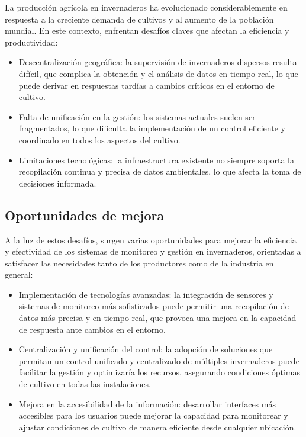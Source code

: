 La producción agrícola en invernaderos ha evolucionado considerablemente en respuesta a la creciente demanda de cultivos y al aumento de la población mundial. En este contexto, enfrentan desafíos claves que afectan la eficiencia y productividad:

\begin{itemize}
	\item Descentralización geográfica: la supervisión de invernaderos dispersos resulta difícil, que complica la obtención y el análisis de datos en tiempo real, lo que puede derivar en respuestas tardías a cambios críticos en el entorno de cultivo.
	\item Falta de unificación en la gestión: los sistemas actuales suelen ser fragmentados, lo que dificulta la implementación de un control eficiente y coordinado en todos los aspectos del cultivo.
	\item Limitaciones tecnológicas: la infraestructura existente no siempre soporta la recopilación continua y precisa de datos ambientales, lo que afecta la toma de decisiones informada.
\end{itemize}

\subsection{Oportunidades de mejora}

A la luz de estos desafíos, surgen varias oportunidades para mejorar la eficiencia y efectividad de los sistemas de monitoreo y gestión en invernaderos, orientadas a satisfacer las necesidades tanto de los productores como de la industria en general:

\begin{itemize}
	\item Implementación de tecnologías avanzadas: la integración de sensores y sistemas de monitoreo más sofisticados puede permitir una recopilación de datos más precisa y en tiempo real, que provoca una mejora en la capacidad de respuesta ante cambios en el entorno.
	\item Centralización y unificación del control: la adopción de soluciones que permitan un control unificado y centralizado de múltiples invernaderos puede facilitar la gestión y optimizaría los recursos, asegurando condiciones óptimas de cultivo en todas las instalaciones.
	\item Mejora en la accesibilidad de la información: desarrollar interfaces más accesibles para los usuarios puede mejorar la capacidad para monitorear y ajustar condiciones de cultivo de manera eficiente desde cualquier ubicación.
\end{itemize}

